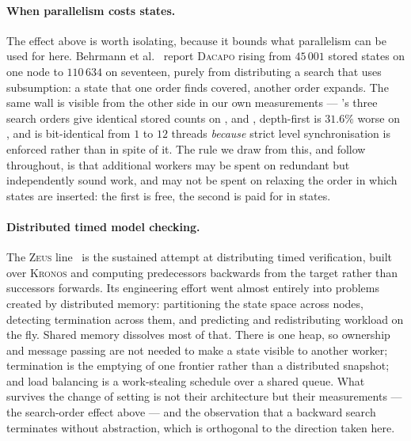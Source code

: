 \paragraph{When parallelism costs states.}
The effect above is worth isolating, because it bounds what parallelism can be used for here.
Behrmann et al.~\cite{Behrmann00} report \textsc{Dacapo} rising from $45\,001$ stored states on one
node to $110\,634$ on seventeen, purely from distributing a search that uses subsumption: a state
that one order finds covered, another order expands.  The same wall is visible from the other side
in our own measurements --- \uppaal{}'s three search orders give identical stored counts on
,  and , depth-first is $31.6\%$ worse on , and
 is bit-identical from $1$ to $12$ threads \emph{because} strict level
synchronisation is enforced rather than in spite of it.  The rule we draw from this, and follow
throughout, is that additional workers may be spent on redundant but independently sound work, and
may not be spent on relaxing the order in which states are inserted: the first is free, the second
is paid for in states.

\paragraph{Distributed timed model checking.}
The \textsc{Zeus} line~\cite{Braberman05,Braberman06} is the sustained attempt at
distributing timed verification, built over \textsc{Kronos} and computing
predecessors backwards from the target rather than successors forwards.  Its
engineering effort went almost entirely into problems created by distributed
memory: partitioning the state space across nodes, detecting termination across
them, and predicting and redistributing workload on the fly.  Shared memory
dissolves most of that.  There is one heap, so ownership and message passing are
not needed to make a state visible to another worker; termination is the emptying
of one frontier rather than a distributed snapshot; and load balancing is a
work-stealing schedule over a shared queue.  What survives the change of setting
is not their architecture but their measurements --- the search-order effect
above --- and the observation that a backward search terminates without
abstraction, which is orthogonal to the direction taken here.

